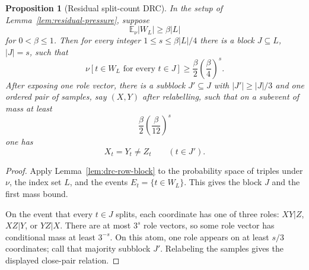 \documentclass[11pt]{article}
\newtheorem{proposition}[theorem]{Proposition}
\newcommand{\EE}{\mathbb E}
\begin{document}
\begin{proposition}[Residual split-count DRC]
\label{prop:residual-drc}
In the setup of Lemma~\ref{lem:residual-pressure}, suppose
\[
  \EE_\nu |W_L|\ge \beta |L|
\]
for $0<\beta\le 1$.  Then for every integer
$1\le s\le \beta |L|/4$ there is a block $J\subseteq L$, $|J|=s$, such that
\[
  \nu[t\in W_L\text{ for every }t\in J]
  \ge
  \frac{\beta}{2}\left(\frac{\beta}{4}\right)^s.
\]
After exposing one role vector, there is a subblock $J'\subseteq J$ with
$|J'|\ge |J|/3$ and one ordered pair of samples, say $(X,Y)$ after relabelling,
such that on a subevent of mass at least
\[
  \frac{\beta}{2}\left(\frac{\beta}{12}\right)^s
\]
one has
\[
  X_t=Y_t\ne Z_t\qquad (t\in J').
\]
\end{proposition}

\begin{proof}
Apply Lemma~\ref{lem:drc-row-block} to the probability space of triples under
$\nu$, the index set $L$, and the events $E_t=\{t\in W_L\}$.  This gives the
block $J$ and the first mass bound.

On the event that every $t\in J$ splits, each coordinate has one of three
roles: $XY|Z$, $XZ|Y$, or $YZ|X$.  There are at most $3^s$ role vectors, so
some role vector has conditional mass at least $3^{-s}$.  On this atom, one
role appears on at least $s/3$ coordinates; call that majority subblock
$J'$.  Relabeling the samples gives the displayed close-pair relation.
\end{proof}
\end{document}
